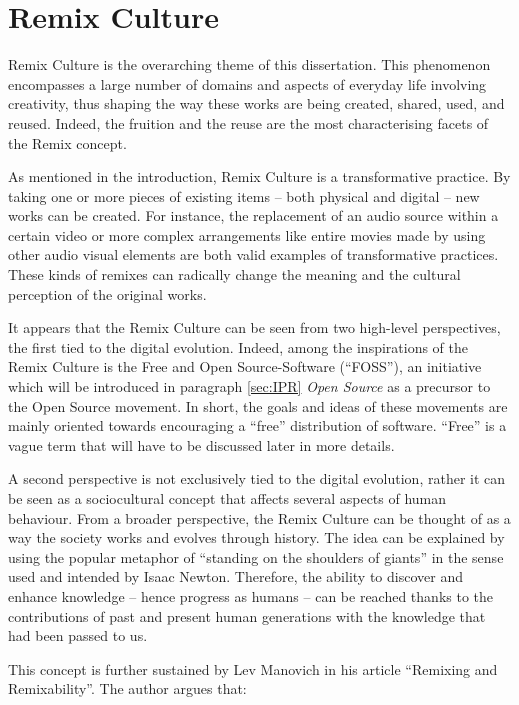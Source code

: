 \chapter{Remix Culture}
\label{ch:ch1_RemixCulture}


Remix Culture is the overarching theme of this dissertation. This phenomenon encompasses a large number of domains and aspects of everyday life involving creativity, thus shaping the way these works are being created, shared, used, and reused. Indeed, the fruition and the reuse are the most characterising facets of the Remix concept.

As mentioned in the introduction, Remix Culture is a transformative practice. By taking one or more pieces of existing items – both physical and digital – new works can be created. For instance, the replacement of an audio source within a certain video or more complex arrangements like entire movies made by using other audio visual elements are both valid examples of transformative practices. These kinds of remixes can radically change the meaning and the cultural perception of the original works.

It appears that the Remix Culture can be seen from two high-level perspectives, the first tied to the digital evolution. Indeed, among the inspirations of the Remix Culture is the Free and Open Source-Software (“FOSS”), an initiative which will be introduced in paragraph \ref{sec:IPR} \emph{Open Source} as a precursor to the Open Source movement. In short, the goals and ideas of these movements are mainly oriented towards encouraging a “free” distribution of software. “Free” is a vague term that will have to be discussed later in more details.

A second perspective is not exclusively tied to the digital evolution, rather it can be seen as a sociocultural concept that affects several aspects of human behaviour. From a broader perspective, the Remix Culture can be thought of as a way the society works and evolves through history. The idea can be explained by using the popular metaphor of “standing on the shoulders of giants” in the sense used and intended by Isaac Newton. Therefore, the ability to discover and enhance knowledge – hence progress as humans – can be reached thanks to the contributions of past and present human generations with the knowledge that had been passed to us.

This concept is further sustained by Lev Manovich in his article “Remixing and Remixability”. The author argues that:

